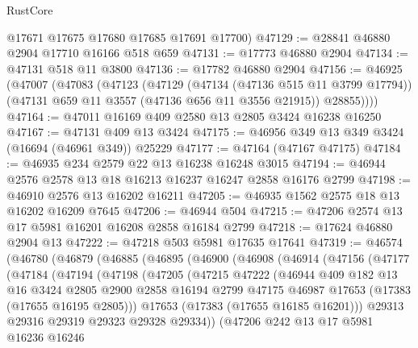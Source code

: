 \begin{lexlean}{RustCore}
\begin{coremodule}
      @17671
      @17675
      @17680
      @17685
      @17691
      @17700)
@47129 := @28841 @46880 @2904 @17710 @16166 @518 @659
@47131 := @17773 @46880 @2904
@47134 := @47131 @518 @11 @3800
@47136 := @17782 @46880 @2904
@47156 := @46925
    (@47007
      (@47083
        (@47123
          (@47129
            (@47134 (@47136 @515 @11 @3799 @17794))
            (@47131 @659 @11 @3557 (@47136 @656 @11 @3556 @21915))
            @28855))))
@47164 := @47011 @16169 @409 @2580 @13 @2805 @3424 @16238 @16250
@47167 := @47131 @409 @13 @3424
@47175 := @46956 @349 @13 @349 @3424 (@16694 (@46961 @349)) @25229
@47177 := @47164 (@47167 @47175)
@47184 := @46935 @234 @2579 @22 @13 @16238 @16248 @3015
@47194 := @46944 @2576 @2578 @13 @18 @16213 @16237 @16247 @2858 @16176 @2799
@47198 := @46910 @2576 @13 @16202 @16211
@47205 := @46935 @1562 @2575 @18 @13 @16202 @16209 @7645
@47206 := @46944 @504
@47215 := @47206 @2574 @13 @17 @5981 @16201 @16208 @2858 @16184 @2799
@47218 := @17624 @46880 @2904 @13
@47222 := @47218 @503 @5981 @17635 @17641
@47319 := @46574
    (@46780
      (@46879
        (@46885
          (@46895
            (@46900
              (@46908
                (@46914
                  (@47156
                    (@47177
                      (@47184
                        (@47194
                          (@47198
                            (@47205
                              (@47215
                                @47222
                                (@46944
                                  @409
                                  @182
                                  @13
                                  @16
                                  @3424
                                  @2805
                                  @2900
                                  @2858
                                  @16194
                                  @2799
                                  @47175
                                  @46987
                                  @17653
                                  (@17383 (@17655 @16195 @2805)))
                                @17653
                                (@17383 (@17655 @16185 @16201)))
                              @29313
                              @29316
                              @29319
                              @29323
                              @29328
                              @29334))
                          (@47206
                            @242
                            @13
                            @17
                            @5981
                            @16236
                            @16246

\end{coremodule}
\end{lexlean}
